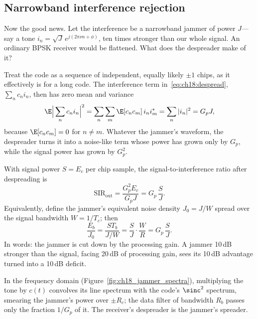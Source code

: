 \subsection{Narrowband interference rejection}
\label{sec:ch18:jamming}

Now the good news. Let the interference be a narrowband jammer of power $J$---say a tone
$i_n=\sqrt J\,e^{j(2\pi\nu n+\phi)}$, ten times stronger than our whole signal. An ordinary BPSK
receiver would be flattened. What does the despreader make of it?

\begin{deeper}
Treat the code as a sequence of independent, equally
likely $\pm1$ chips, as it effectively is for a long code. The interference term
in~\eqref{eq:ch18:despread}, $\sum_nc_ni_n$, then has zero mean and variance
\begin{equation}
\E\Big|\sum_nc_ni_n\Big|^2=\sum_n\sum_m\E[c_nc_m]\,i_ni_m^*=\sum_n|i_n|^2=G_pJ,
\end{equation}
because $\E[c_nc_m]=0$ for $n\ne m$. Whatever the jammer's waveform, the despreader turns it
into a noise-like term whose power has grown only by $G_p$, while the signal power has grown
by $G_p^2$.
\end{deeper}

With signal power $S=E_c$ per chip sample, the signal-to-interference ratio after
despreading is
\begin{equation}
\text{SIR}_{\text{out}}=\frac{G_p^2E_c}{G_pJ}=G_p\,\frac{S}{J}.
\label{eq:ch18:sirout}
\end{equation}
Equivalently, define the jammer's equivalent noise density $J_0=J/W$ spread over the
signal bandwidth $W=1/T_c$; then
\begin{equation}
\frac{E_b}{J_0}=\frac{ST_b}{J/W}=\frac{S}{J}\cdot\frac{W}{R}=G_p\,\frac{S}{J}.
\label{eq:ch18:ebj0}
\end{equation}
In words: the jammer is cut down by the processing gain. A jammer 10\,dB stronger than the signal,
facing 20\,dB of processing gain, sees its 10\,dB advantage turned into a 10\,dB deficit.

In the frequency domain (Figure~\ref{fig:ch18_jammer_spectra}), multiplying the tone by
$c(t)$ convolves its line spectrum with the code's $\sinc^2$ spectrum, smearing the jammer's
power over $\pm R_c$; the data filter of bandwidth $R_b$ passes only the fraction $1/G_p$ of
it. The receiver's despreader is the jammer's spreader.



